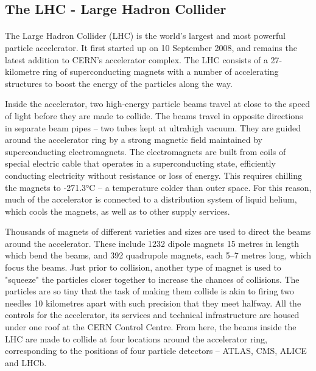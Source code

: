 \documentclass[../main.tex]{subfiles}
\begin{document}
\subsection{The LHC - Large Hadron Collider}
\paragraph{}
The Large Hadron Collider (LHC) is the world’s largest and most powerful particle accelerator. It first started up on 10 September 2008, and remains the latest addition to CERN’s accelerator complex. The LHC consists of a 27-kilometre ring of superconducting magnets with a number of accelerating structures to boost the energy of the particles along the way.
\par \noindent \newline
Inside the accelerator, two high-energy particle beams travel at close to the speed of light before they are made to collide. The beams travel in opposite directions in separate beam pipes – two tubes kept at ultrahigh vacuum. They are guided around the accelerator ring by a strong magnetic field maintained by superconducting electromagnets. The electromagnets are built from coils of special electric cable that operates in a superconducting state, efficiently conducting electricity without resistance or loss of energy. This requires chilling the magnets to ‑271.3°C – a temperature colder than outer space. For this reason, much of the accelerator is connected to a distribution system of liquid helium, which cools the magnets, as well as to other supply services.
\par \noindent \newline
Thousands of magnets of different varieties and sizes are used to direct the beams around the accelerator. These include 1232 dipole magnets 15 metres in length which bend the beams, and 392 quadrupole magnets, each 5–7 metres long, which focus the beams. Just prior to collision, another type of magnet is used to "squeeze" the particles closer together to increase the chances of collisions. The particles are so tiny that the task of making them collide is akin to firing two needles 10 kilometres apart with such precision that they meet halfway. All the controls for the accelerator, its services and technical infrastructure are housed under one roof at the CERN Control Centre. From here, the beams inside the LHC are made to collide at four locations around the accelerator ring, corresponding to the positions of four particle detectors – ATLAS, CMS, ALICE and LHCb.
\end{document}
